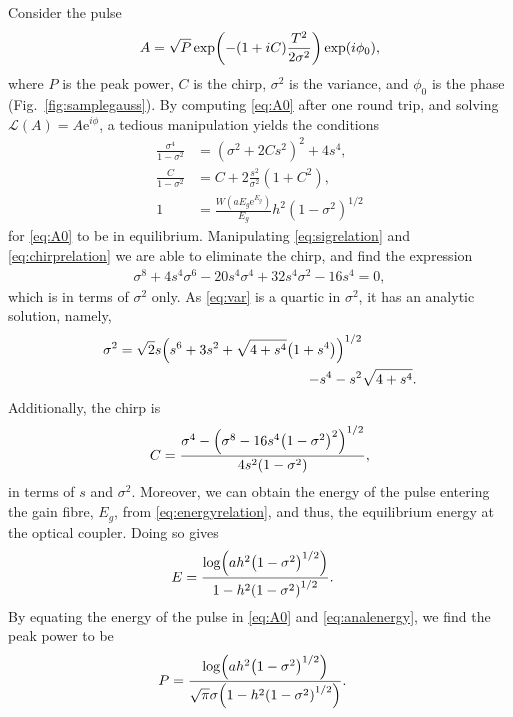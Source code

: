 \documentclass[9pt,twocolumn,twoside]{osajnl}
\let\originalleft\left
\let\originalright\right
\renewcommand{\left}{\mathopen{}\mathclose\bgroup\originalleft}
\renewcommand{\right}{\aftergroup\egroup\originalright}
\begin{document}
Consider the pulse
\begin{align}
	A = \sqrt{P} \exp \left( -(1 + iC) \frac{T^2}{2 \sigma^2} \right) \exp(i \phi_0),
	\label{eq:A0}
\end{align}
where $P$ is the peak power, $C$ is the chirp, $\sigma^2$ is the variance, and $\phi_0$ is the phase (Fig.~\ref{fig:samplegauss}). By computing \eqref{eq:A0} after one round trip, and solving $\mathcal{L}(A) = A \textrm{e}^{i \phi}$, a tedious manipulation yields the conditions
\begin{align}
	\frac{\sigma^4}{1 - \sigma^2} &= (\sigma^2 + 2 C s^2)^2 + 4 s^4, \label{eq:sigrelation} \\
	\frac{C}{1 - \sigma^2} &= C + 2 \frac{s^2}{\sigma^2} (1 + C^2), \label{eq:chirprelation} \\
	1 &= \frac{W(a E_g \textrm{e}^{E_g})}{E_g} h^2 (1 - \sigma^2)^{1/2} \label{eq:energyrelation}
\end{align}
for \eqref{eq:A0} to be in equilibrium. Manipulating \eqref{eq:sigrelation} and \eqref{eq:chirprelation} we are able to eliminate the chirp, and find the expression
\begin{align}
	\sigma^8 + 4 s^4 \sigma^6 - 20 s^4 \sigma^4 + 32 s^4 \sigma^2 - 16 s^4 = 0,
	\label{eq:var}
\end{align}
which is in terms of $\sigma^2$ only. As \eqref{eq:var} is a quartic in $\sigma^2$, it has an analytic solution, namely,
\begin{equation}
	\begin{split}
		\sigma^2 = \sqrt{2} s \left( s^6 + 3s^2 + \sqrt{4 + s^4} \left( 1 + s^4 \right) \right)^{1/2} & \\
		- s^4 - s^2 & \sqrt{4 + s^4}.
		\label{eq:equilvar}
	\end{split}
\end{equation}
Additionally, the chirp is
\begin{align}
	C = \frac{\sigma^4 - \left( \sigma^8 - 16 s^4 \left( 1 - \sigma^2 \right)^2 \right)^{1/2}}{4 s^2 \left( 1 - \sigma^2 \right)},
	\label{eq:chirp}
\end{align}
in terms of $s$ and $\sigma^2$. Moreover, we can obtain the energy of the pulse entering the gain fibre, $E_g$, from \eqref{eq:energyrelation}, and thus, the equilibrium energy at the optical coupler. Doing so gives
\begin{align}
	E &= \frac{\log \left( a h^2 \left( 1 - \sigma^2 \right)^{1/2} \right)}{1 - h^2 \left( 1 - \sigma^2 \right)^{1/2}}.
	\label{eq:analenergy}
\end{align}
By equating the energy of the pulse in \eqref{eq:A0} and \eqref{eq:analenergy}, we find the peak power to be
\begin{align}
	P &= \frac{\log \left( a h^2 \left( 1 - \sigma^2 \right)^{1/2} \right)}{\sqrt{\pi} \sigma \left( 1 - h^2 \left( 1 - \sigma^2 \right)^{1/2} \right)}.
	\label{eq:analpower}
\end{align}
\end{document}
